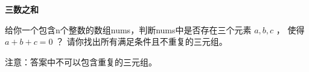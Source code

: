 \textbf{三数之和}\par

给你一个包含n个整数的数组nums，判断nums中是否存在三个元素 $ a, b, c $ ，
使得 $ a + b + c = 0 $ ？
请你找出所有满足条件且不重复的三元组。\par

注意：答案中不可以包含重复的三元组。\par
